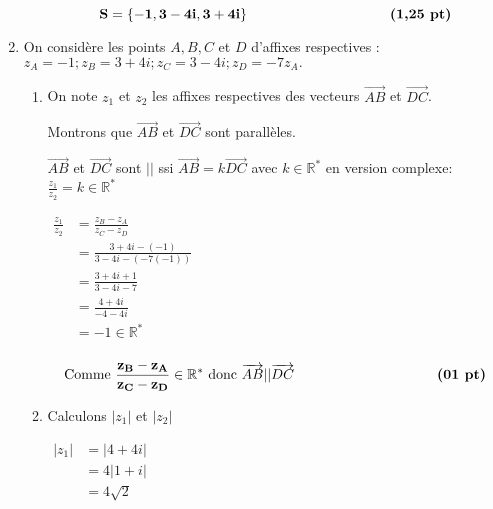 \documentclass[12pt,a4paper]{article}
\begin{document}
\begin{enumerate}
\begin{enumerate}
\begin{resultbox}
    \[
    \mathbf{S = \left\lbrace -1 , 3 - 4i , 3 + 4i \right\rbrace}\hspace{3.6cm} \textbf{(1,25 pt)}
    \]
\end{resultbox}

    \end{enumerate}
    \item On considère les points \( A, B, C \) et \( D \) d’affixes respectives :
    \(
    z_A = -1 ; z_B = 3 + 4i ; z_C = 3 - 4i ; z_D = -7z_A.
    \)
    \begin{enumerate}
        \item On note \( z_1 \) et \( z_2 \) les affixes respectives des vecteurs \( \overrightarrow{AB} \) et \( \overrightarrow{DC} \). 
        
        Montrons que \( \overrightarrow{AB} \) et \( \overrightarrow{DC} \) sont parallèles.

				\( \overrightarrow{AB} \) et \( \overrightarrow{DC} \) sont $||$ ssi \( \overrightarrow{AB}=k\overrightarrow{DC} \)    avec $k\in\mathbb{R}^{*}$ en version complexe: \( \frac{z_1}{z_2} = k\in\mathbb{R}^{*} \)
        
        \( 
        \begin{aligned}
        				\frac{z_1}{z_2} &=\frac{z_B-z_A}{z_C-z_D}\\
        												&=\frac{3 + 4i-(-1)}{3 - 4i-(-7(-1))}\\
        												&=\frac{3 + 4i+1}{3 - 4i-7}\\
        												&=\frac{4 + 4i}{-4 - 4i}\\
        												&=-1\in\mathbb{R}^{*}\\
        \end{aligned}
         \)
        
\begin{resultbox}
    \[
    \mathbf{\text{Comme } \frac{z_B-z_A}{z_C-z_D} \in\mathbb{R}^{*} \text{ donc } \overrightarrow{AB} || \overrightarrow{DC}\hspace{3.6cm} \textbf{(01 pt)}}
    \]
\end{resultbox}
  
        \item 
        
        Calculons \( |z_1| \) et \( |z_2| \) 

				\(
				\begin{aligned}
				 |z_1| &= |4 + 4i|\\
				 			 &=4|1 + i|\\
				 			 &=4\sqrt{2}
				 \end{aligned}
				 \)        


\end{enumerate}
\end{enumerate}
\end{document}
